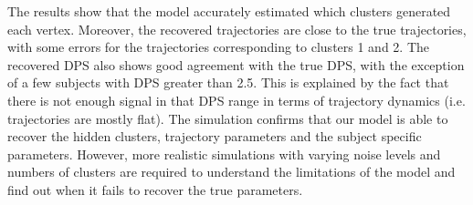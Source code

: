 The results show that the model accurately estimated which clusters generated each vertex. Moreover, the recovered trajectories are close to the true trajectories, with some errors for the trajectories corresponding to clusters 1 and 2. The recovered DPS also shows good agreement with the true DPS, with the exception of a few subjects with DPS greater than 2.5. This is explained by the fact that there is not enough signal in that DPS range in terms of trajectory dynamics (i.e. trajectories are mostly flat). The simulation confirms that our model is able to recover the hidden clusters, trajectory parameters and the subject specific parameters. However, more realistic simulations with varying noise levels and numbers of clusters are required to understand the limitations of the model and find out when it fails to recover the true parameters. 


